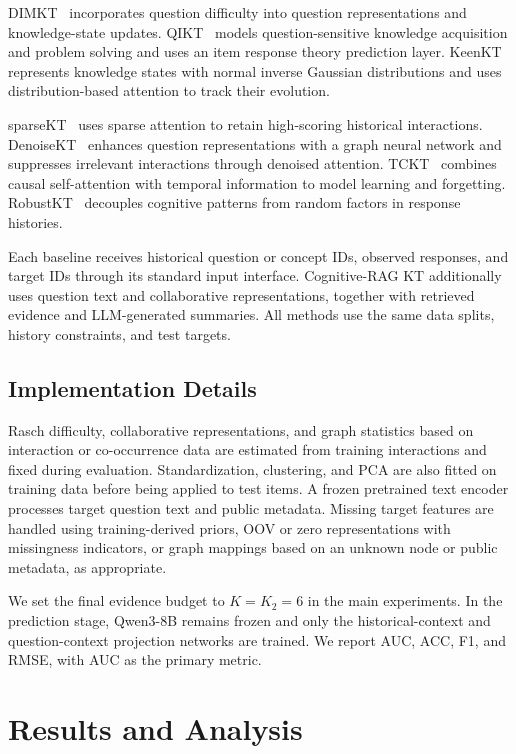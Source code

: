 \documentclass{llncs}
\begin{document}
DIMKT~\cite{shen2022dimkt} incorporates question difficulty into question representations and knowledge-state updates. QIKT~\cite{chen2023qikt} models question-sensitive knowledge acquisition and problem solving and uses an item response theory prediction layer. KeenKT~\cite{li2026keenkt} represents knowledge states with normal inverse Gaussian distributions and uses distribution-based attention to track their evolution.

sparseKT~\cite{huang2023sparsekt} uses sparse attention to retain high-scoring historical interactions. DenoiseKT~\cite{deng2025denoisekt} enhances question representations with a graph neural network and suppresses irrelevant interactions through denoised attention. TCKT~\cite{huang2024tckt} combines causal self-attention with temporal information to model learning and forgetting. RobustKT~\cite{guo2025robustkt} decouples cognitive patterns from random factors in response histories.

Each baseline receives historical question or concept IDs, observed responses, and target IDs through its standard input interface. Cognitive-RAG KT additionally uses question text and collaborative representations, together with retrieved evidence and LLM-generated summaries. All methods use the same data splits, history constraints, and test targets.

\subsection{Implementation Details}

Rasch difficulty, collaborative representations, and graph statistics based on interaction or co-occurrence data are estimated from training interactions and fixed during evaluation. Standardization, clustering, and PCA are also fitted on training data before being applied to test items. A frozen pretrained text encoder processes target question text and public metadata. Missing target features are handled using training-derived priors, OOV or zero representations with missingness indicators, or graph mappings based on an unknown node or public metadata, as appropriate.

We set the final evidence budget to $K=K_2=6$ in the main experiments. In the prediction stage, Qwen3-8B remains frozen and only the historical-context and question-context projection networks are trained. We report AUC, ACC, F1, and RMSE, with AUC as the primary metric.


\section{Results and Analysis}
\end{document}
